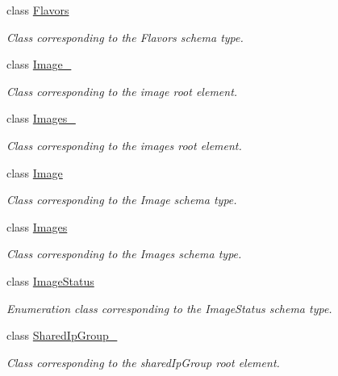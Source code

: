 \begin{DoxyCompactItemize}
class \hyperlink{classopenstack_1_1xml_1_1Flavors}{Flavors}
\begin{DoxyCompactList}\small\item\em Class corresponding to the Flavors schema type. \item\end{DoxyCompactList}\item 
class \hyperlink{classopenstack_1_1xml_1_1Image__}{Image\_\-}
\begin{DoxyCompactList}\small\item\em Class corresponding to the image root element. \item\end{DoxyCompactList}\item 
class \hyperlink{classopenstack_1_1xml_1_1Images__}{Images\_\-}
\begin{DoxyCompactList}\small\item\em Class corresponding to the images root element. \item\end{DoxyCompactList}\item 
class \hyperlink{classopenstack_1_1xml_1_1Image}{Image}
\begin{DoxyCompactList}\small\item\em Class corresponding to the Image schema type. \item\end{DoxyCompactList}\item 
class \hyperlink{classopenstack_1_1xml_1_1Images}{Images}
\begin{DoxyCompactList}\small\item\em Class corresponding to the Images schema type. \item\end{DoxyCompactList}\item 
class \hyperlink{classopenstack_1_1xml_1_1ImageStatus}{ImageStatus}
\begin{DoxyCompactList}\small\item\em Enumeration class corresponding to the ImageStatus schema type. \item\end{DoxyCompactList}\item 
class \hyperlink{classopenstack_1_1xml_1_1SharedIpGroup__}{SharedIpGroup\_\-}
\begin{DoxyCompactList}\small\item\em Class corresponding to the sharedIpGroup root element. \item\end{DoxyCompactList}\item 

\end{DoxyCompactItemize}

